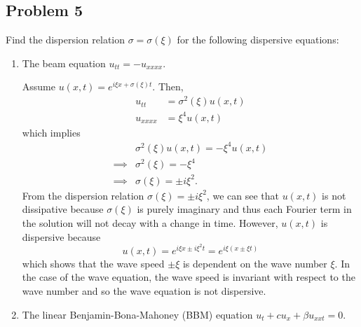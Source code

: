 \documentclass[a4paper,12pt]{article}
\begin{document}
\subsection*{Problem 5}
	Find the dispersion relation $ \sigma = \sigma(\xi) $ for the following dispersive equations:
	\begin{enumerate}[label = \textbf{(\alph*)}]
		\item The beam equation $ u_{tt} = -u_{xxxx} $.
		
		Assume $ u(x,t) = e^{i\xi x + \sigma(\xi)t} $. Then,
		\begin{align*}
			u_{tt}       &= \sigma^2(\xi)u(x,t) \\
			u_{xxxx} &= \xi^4 u(x,t)
		\end{align*}
		which implies
		\begin{align*}
			& \sigma^2(\xi)u(x,t) = -\xi^4 u(x,t) \\
			\implies & \sigma^2(\xi) = -\xi^4 \\
			\implies & \sigma(\xi) = \pm i \xi^2.
		\end{align*}
		From the dispersion relation $ \sigma(\xi) = \pm i \xi^2 $, we can see that $ u(x,t) $ is not dissipative because $ \sigma(\xi) $ is purely imaginary and thus each Fourier term in the solution will not decay with a change in time. However, $ u(x,t) $ is dispersive because 
		\[
			u(x,t) = e^{i \xi x \pm i \xi^2 t} = e^{i \xi (x \pm \xi t)}
		\]
		which shows that the wave speed $ \pm \xi $ is dependent on the wave number $ \xi $. In the case of the wave equation, the wave speed is invariant with respect to the wave number and so the wave equation is not dispersive.
		
		\item The linear Benjamin-Bona-Mahoney (BBM) equation $ u_t + c u_x + \beta u_{xxt} = 0 $.
		

\end{enumerate}
\end{document}
